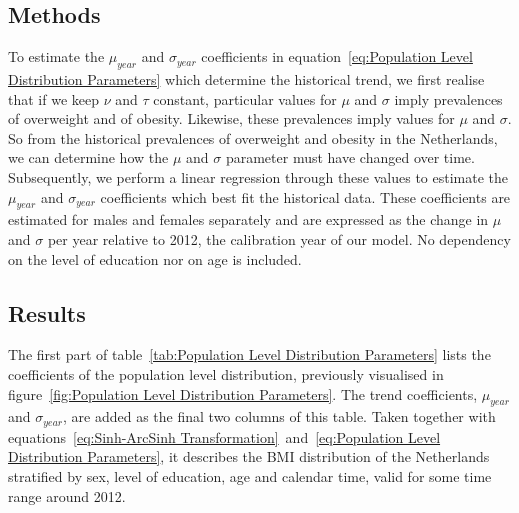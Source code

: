 \documentclass{imammb}
\numberwithin{equation}{section}
\begin{document}
\subsection{Methods}
\label{sec:Historical Trend/Methods}

To estimate the $\mu_{year}$ and $\sigma_{year}$ coefficients in equation~\ref{eq:Population Level Distribution Parameters} which determine the historical trend, we first realise that if we keep $\nu$ and $\tau$ constant, particular values for $\mu$ and $\sigma$ imply prevalences of overweight and of obesity. Likewise, these prevalences imply values for $\mu$ and $\sigma$. So from the historical prevalences of overweight and obesity in the Netherlands, we can determine how the $\mu$ and $\sigma$ parameter must have changed over time. Subsequently, we perform a linear regression through these values to estimate the $\mu_{year}$ and $\sigma_{year}$ coefficients which best fit the historical data. These coefficients are estimated for males and females separately and are expressed as the change in $\mu$ and $\sigma$ per year relative to 2012, the calibration year of our model. No dependency on the level of education nor on age is included.

\vspace{-1mm}

\subsection{Results}
\label{sec:Historical Trend/Results}

The first part of table~\ref{tab:Population Level Distribution Parameters} lists the coefficients of the population level distribution, previously visualised in figure~\ref{fig:Population Level Distribution Parameters}. The trend coefficients, $\mu_{year}$ and $\sigma_{year}$, are added as the final two columns of this table. Taken together with equations~\ref{eq:Sinh-ArcSinh Transformation}~and~\ref{eq:Population Level Distribution Parameters}, it describes the BMI distribution of the Netherlands stratified by sex, level of education, age and calendar time, valid for some time range around 2012.
\end{document}
